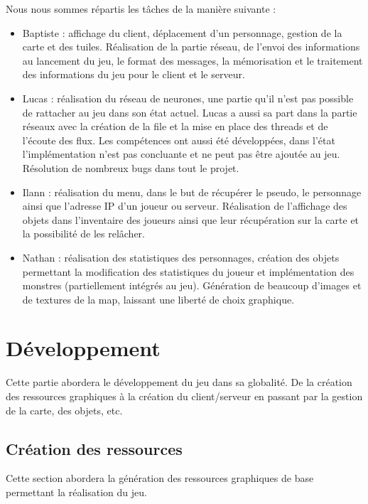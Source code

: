 \documentclass[11pt]{article}
\begin{document}
        Nous nous sommes répartis les tâches de la manière suivante :
        \begin{itemize}
            \item Baptiste : affichage du client, déplacement d’un personnage, gestion de la carte et des tuiles. Réalisation de la partie réseau, de l’envoi des informations au lancement du jeu, le format des messages, la mémorisation et le traitement des informations du jeu pour le client et le serveur.       
            \item Lucas : réalisation du réseau de neurones, une partie qu'il n’est pas possible de rattacher au jeu dans son état actuel. Lucas a aussi sa part dans la partie réseaux avec la création de la file et la mise en place des threads et de l’écoute des flux. Les compétences ont aussi été développées, dans l’état l’implémentation n’est pas concluante et ne peut pas être ajoutée au jeu. Résolution de nombreux bugs dans tout le projet. 
            \item Ilann : réalisation du menu, dans le but de récupérer le pseudo, le personnage ainsi que l'adresse IP d’un joueur ou serveur. Réalisation de l’affichage des objets dans l’inventaire des joueurs ainsi que leur récupération sur la carte et la possibilité de les relâcher.  
            \item Nathan : réalisation des statistiques des personnages, création des objets permettant la modification des statistiques du joueur et implémentation des monstres (partiellement intégrés au jeu). Génération de beaucoup d'images et de textures de la map, laissant une liberté de choix graphique.
        \end{itemize}
    \section{Développement}
    Cette partie abordera le développement du jeu dans sa globalité. De la création des ressources graphiques à la création du client/serveur en passant par la gestion de la carte, des objets, etc. 
        \subsection{Création des ressources}
        Cette section abordera la génération des ressources graphiques de base permettant la réalisation du jeu.
\end{document}
